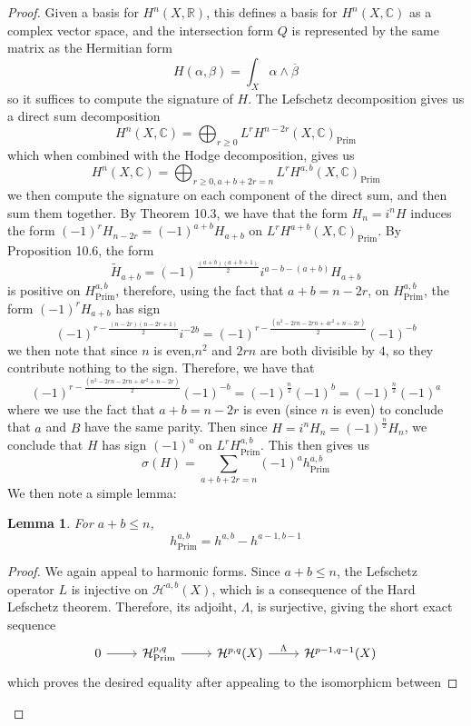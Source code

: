 \documentclass[psamsfonts, 12pt]{amsart}
\newtheorem{lem}[thm]{Lemma}
\theoremstyle{definition}
\theoremstyle{remark}
\newcommand{\R}{\mathbb{R}}
\newcommand{\C}{\mathbb{C}}
\begin{document}
%
\begin{proof}
Given a basis for $H^n(X,\R)$, this defines a basis for $H^n(X,\C)$ as a complex
vector space, and the intersection form $Q$ is represented by the same matrix as
the Hermitian form
\[
H(\alpha,\beta) = \int_X \alpha \wedge \overline{\beta}
\]
so it suffices to compute the signature of $H$. The Lefschetz decomposition gives
us a direct sum decomposition
\[
H^n(X,\C) = \bigoplus_{r\geq 0}L^rH^{n-2r}(X,\C)_{\mathrm{Prim}}
\]
which when combined with the Hodge decomposition, gives us
\[
H^n(X,\C) = \bigoplus_{r\geq 0, a+b+2r = n}L^rH^{a,b}(X,\C)_{\mathrm{Prim}}
\]
we then compute the signature on each component of the direct sum, and then sum them
together. By Theorem 10.3, we have that the form $H_n = i^nH$ induces
the form $(-1)^rH_{n-2r} = (-1)^{a+b}H_{a+b}$ on
$L^rH^{a+b}(X, \C)_{\mathrm{Prim}}$. By Proposition 10.6, the form
\[
\widetilde{H}_{a+b} = (-1)^{\frac{(a+b)(a+b+1)}{2}}i^{a-b-(a+b)}H_{a+b}
\]
is positive on $H^{a,b}_{\mathrm{Prim}}$, therefore,
using the fact that $a+b = n-2r$, on $H^{a,b}_{\mathrm{Prim}}$, the form
$(-1)^rH_{a+b}$ has sign
\[
(-1)^{r - \frac{(n-2r)(n-2r+1)}{2}}i^{-2b} =
(-1)^{r - \frac{(n^2-2rn-2rn+4r^2+n-2r)}{2}}(-1)^{-b}
\]
we then note that since $n$ is even,$n^2$ and $2rn$ are both divisible by $4$, so they
contribute nothing to the sign. Therefore, we have that
\[
(-1)^{r - \frac{(n^2-2rn-2rn+4r^2+n-2r)}{2}}(-1)^{-b} = (-1)^{\frac{n}{2}}(-1)^b
= (-1)^{\frac{n}{2}}(-1)^a
\]
where we use the fact that $a+b = n - 2r$ is even (since $n$ is even) to conclude that
$a$ and $B$ have the same parity. Then since $H = i^nH_n = (-1)^{\frac{n}{2}}H_n$,
we conclude that $H$ has sign $(-1)^a$ on $L^rH^{a,b}_{\mathrm{Prim}}$. This then
gives us
\[
\sigma(H) = \sum_{a+b+2r=n}(-1)^ah^{a,b}_{\mathrm{Prim}}
\]
We then note a simple lemma:
%
\begin{lem}
For $a+b \leq n$,
\[
h^{a,b}_{\mathrm{Prim}} = h^{a,b} - h^{a-1,b-1}
\]
\end{lem}
%
\begin{proof}
We again appeal to harmonic forms. Since $a+b \leq n$, the Lefschetz operator $L$ is
injective on $\mathcal{H}^{a,b}(X)$, which is a consequence of the Hard Lefschetz
theorem. Therefore, its adjoiht, $\Lambda$, is surjective, giving the
short exact sequence
\[\begin{tikzcd}
0 \ar[r] & \mathcal{H}^{p,q}_{\mathrm{Prim}} \ar[r] & \mathcal{H}^{p,q}(X)
\ar[r, "\Lambda"] & \mathcal{H}^{p-1,q-1}(X)
\end{tikzcd}\]
which proves the desired equality after appealing to the isomorphicm between

\end{proof}
\end{proof}
\end{document}
